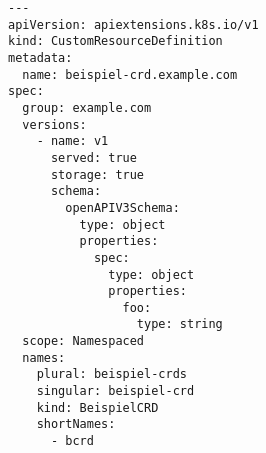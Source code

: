 \begin{verbatim}
---
apiVersion: apiextensions.k8s.io/v1
kind: CustomResourceDefinition
metadata:
  name: beispiel-crd.example.com
spec:
  group: example.com
  versions:
    - name: v1
      served: true
      storage: true
      schema:
        openAPIV3Schema:
          type: object
          properties:
            spec:
              type: object
              properties:
                foo:
                  type: string
  scope: Namespaced
  names:
    plural: beispiel-crds
    singular: beispiel-crd
    kind: BeispielCRD
    shortNames:
      - bcrd
\end{verbatim}